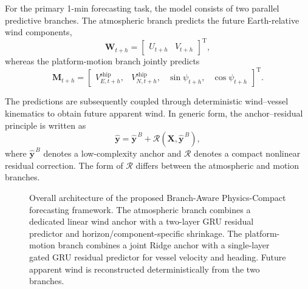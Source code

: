 For the primary 1-min forecasting task, the model consists of two parallel predictive branches. The atmospheric branch predicts the future Earth-relative wind components,
\begin{equation}
\mathbf{W}_{t+h}
=
\begin{bmatrix}
U_{t+h} & V_{t+h}
\end{bmatrix}^{\mathrm T},
\label{eq:true_wind_state}
\end{equation}
whereas the platform-motion branch jointly predicts
\begin{equation}
\mathbf{M}_{t+h}
=
\begin{bmatrix}
V^{\mathrm{ship}}_{E,t+h},
&
V^{\mathrm{ship}}_{N,t+h},
&
\sin\psi_{t+h},
&
\cos\psi_{t+h}
\end{bmatrix}^{\mathrm T}.
\label{eq:motion_state}
\end{equation}

The predictions are subsequently coupled through deterministic wind--vessel kinematics to obtain future apparent wind. In generic form, the anchor--residual principle is written as
\begin{equation}
\hat{\mathbf y}
=
\hat{\mathbf y}^{\,B}
+
\mathcal{R}
\left(
\mathbf X,
\hat{\mathbf y}^{\,B}
\right),
\label{eq:generic_anchor_residual}
\end{equation}
where $\hat{\mathbf y}^{\,B}$ denotes a low-complexity anchor and $\mathcal{R}$ denotes a compact nonlinear residual correction. The form of $\mathcal{R}$ differs between the atmospheric and motion branches.

\begin{figure}[!t]
    \centering
    \caption{
    Overall architecture of the proposed Branch-Aware Physics-Compact forecasting framework. The atmospheric branch combines a dedicated linear wind anchor with a two-layer GRU residual predictor and horizon/component-specific shrinkage. The platform-motion branch combines a joint Ridge anchor with a single-layer gated GRU residual predictor for vessel velocity and heading. Future apparent wind is reconstructed deterministically from the two branches.
    }
    \label{fig:framework}
\end{figure}

